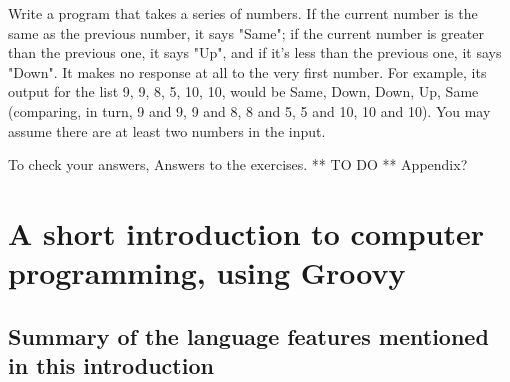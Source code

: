 Write a program that takes
a series of numbers.  If the
current number is the same as the previous number, it says "Same";
if the current number is greater than the previous one, it says "Up",
and if it's less than the previous one, it says "Down".
It makes no response at all to the
very first number.  For example, its output for the list 9, 9, 8, 5, 10, 10,
would be Same, Down, Down, Up, Same
(comparing, in turn, 9 and 9, 9 and 8, 8 and 5, 5 and 10, 10 and 10).
You may assume there are at least two numbers in the input.

To check your answers, Answers to the exercises. ** TO DO ** Appendix?

\section{A short introduction to computer programming, using Groovy}

\subsection{Summary of the language features mentioned in this introduction}

